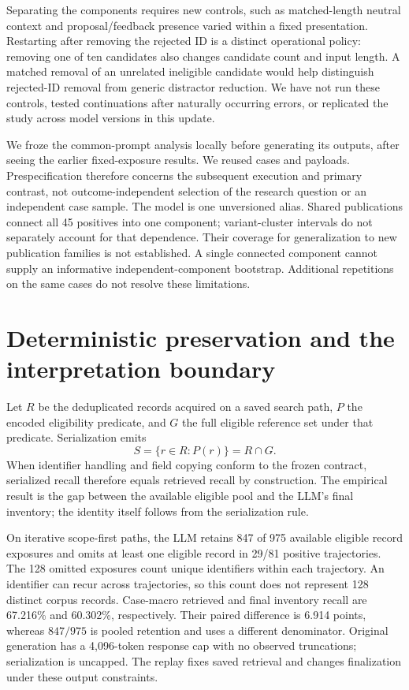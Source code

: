 \documentclass[11pt]{article}
\begin{document}
Separating the components requires new controls, such as matched-length neutral
context and proposal/feedback presence varied within a fixed presentation.
Restarting after removing the rejected ID is a distinct operational policy:
removing one of ten candidates also changes candidate count and input length. A
matched removal of an unrelated ineligible candidate would help distinguish
rejected-ID removal from generic distractor reduction. We have not run these
controls, tested continuations after naturally occurring errors, or replicated
the study across model versions in this update.

We froze the common-prompt analysis locally before generating its outputs, after
seeing the earlier fixed-exposure results. We reused cases and payloads.
Prespecification therefore concerns the subsequent execution and primary
contrast, not outcome-independent selection of the research question or an
independent case sample. The model is one unversioned alias. Shared publications
connect all 45 positives into one component; variant-cluster intervals do not
separately account for that dependence. Their coverage for generalization to new
publication families is not established. A single connected component cannot
supply an informative independent-component bootstrap. Additional repetitions on
the same cases do not resolve these limitations.

\section{Deterministic preservation and the interpretation boundary}

Let $R$ be the deduplicated records acquired on a saved search path, $P$ the
encoded eligibility predicate, and $G$ the full eligible reference set under
that predicate. Serialization emits \[ S=\{r\in R:P(r)\}=R\cap G. \] When
identifier handling and field copying conform to the frozen contract, serialized
recall therefore equals retrieved recall by construction. The empirical result
is the gap between the available eligible pool and the LLM's final inventory;
the identity itself follows from the serialization rule.

On iterative scope-first paths, the LLM retains 847 of 975 available eligible
record exposures and omits at least one eligible record in 29/81 positive
trajectories. The 128 omitted exposures count unique identifiers within each
trajectory. An identifier can recur across trajectories, so this count does not
represent 128 distinct corpus records. Case-macro retrieved and final inventory
recall are 67.216\% and 60.302\%, respectively. Their paired difference is 6.914
points, whereas $847/975$ is pooled retention and uses a different denominator.
Original generation has a 4,096-token response cap with no observed truncations;
serialization is uncapped. The replay fixes saved retrieval and changes
finalization under these output constraints.
\end{document}
